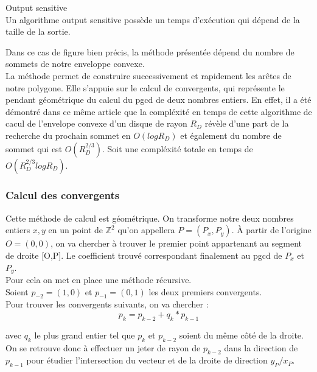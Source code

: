 \begin{Definition}{Output sensitive}\\
\label{def:os}
      Un algorithme output sensitive possède un temps d’exécution qui dépend de la taille de la sortie.
\end{Definition}

Dans ce cas de figure bien précis, la méthode présentée dépend du nombre de sommets de notre enveloppe convexe. \\

La méthode permet de construire successivement et rapidement les arêtes de notre polygone. Elle s'appuie sur le calcul de convergents, qui représente le pendant géométrique du calcul du pgcd de deux nombres entiers. 
En effet, il a été démontré dans ce même article que la compléxité en temps de cette algorithme de cacul de l'envelope convexe d'un disque de rayon $R_D$ révèle d'une part de la recherche du prochain sommet en $O(log R_D)$ et également du nombre de sommet qui est $O( R_{D}^{2/3})$. Soit une compléxité totale en temps de  $O( R_{D}^{2/3} log R_D)$.


\subsubsection{Calcul des convergents}

Cette méthode de calcul est géométrique. On transforme notre deux nombres entiers $x, y$ en un point de $\mathbb{Z}^{2}$ qu'on appellera $P = (P_x, P_y)$. À partir de l’origine $O=(0,0)$, on va chercher à trouver le premier point appartenant au segment de droite [O,P]. Le coefficient trouvé correspondant finalement au pgcd de $P_x$ et $P_y$.\\

Pour cela on met en place une méthode récursive.\\
Soient $p_{-2} = (1,0)$ et $p_{-1} = (0,1)$ les deux premiers convergents.\\

Pour trouver les convergents suivants, on va chercher :
$$p_{k} = p_{k-2} + q_k * p_{k-1}$$

avec $q_k$ le plus grand entier tel que $p_{k}$ et $p_{k-2}$ soient du même côté de la droite.\\

On se retrouve donc à effectuer un jeter de rayon de $p_{k-2}$ dans la direction de $p_{k-1}$ pour étudier l’intersection du vecteur et de la droite de direction $y_P / x_P$.\\

